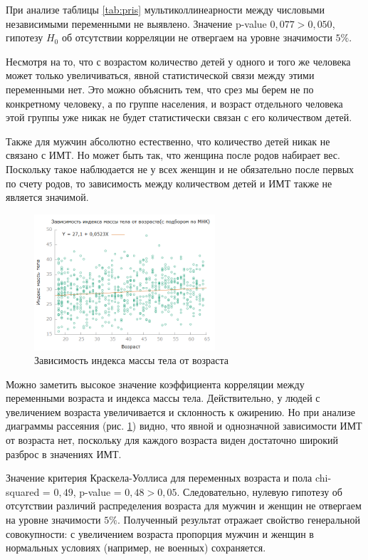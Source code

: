\documentclass[a4paper,12pt]{article}
\begin{document}
При анализе таблицы \ref{tab:pris} мультиколлинеарности между числовыми независимыми переменными не выявлено. Значение p-value $0,077 > 0,050$, гипотезу $H_0$ об отсутствии корреляции не отвергаем на уровне значимости $5\%$.

Несмотря на то, что с возрастом количество детей у одного и того же человека может только увеличиваться, явной статистической связи между этими переменными нет. Это можно объяснить тем, что срез мы берем не по конкретному человеку, а по группе населения, и возраст отдельного человека этой группы уже никак не будет статистически связан с его количеством детей. 

Также для мужчин абсолютно естественно, что количество детей никак не связано с ИМТ. Но может быть так, что женщина после родов набирает вес. Поскольку такое наблюдается не у всех женщин и не обязательно после первых по счету родов, то зависимость между количеством детей и ИМТ также не является значимой.

\begin{figure}[H]
	\includegraphics[width=0.6\textwidth]{../[graphics]/bmi-age.png}
	\centering
	\caption{Зависимость индекса массы тела от возраста}
	\label{fig:bmi-age}
\end{figure}

Можно заметить высокое значение коэффициента корреляции между переменными возраста и индекса массы тела. Действительно, у людей с увеличением возраста увеличивается и склонность к ожирению. Но при анализе диаграммы рассеяния (рис. \ref{fig:bmi-age}) видно, что явной и однозначной зависимости ИМТ от возраста нет, поскольку для каждого возраста виден достаточно широкий разброс в значениях ИМТ.
	
Значение критерия Краскела-Уоллиса для переменных возраста и пола chi-squared = $0,49$, p-value = $0,48 > 0,05$. Следовательно, нулевую гипотезу об отсутствии различий распределения возраста для мужчин и женщин не отвергаем на уровне значимости $5\%$. Полученный результат отражает свойство генеральной совокупности: с увеличением возраста пропорция мужчин и женщин в нормальных условиях (например, не военных) сохраняется. 
\end{document}
